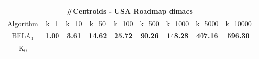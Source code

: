 \begin{tabular}{c|cccccccc}\toprule
\multicolumn{9}{c}{#Centroids - USA Roadmap dimacs}\\ \midrule
Algorithm & k=1 & k=10 & k=50 & k=100 & k=500 & k=1000 & k=5000 & k=10000 \\ \midrule
BELA$_0$ & \textbf{1.00} & \textbf{3.61} & \textbf{14.62} & \textbf{25.72} & \textbf{90.26} & \textbf{148.28} & \textbf{407.16} & \textbf{596.30} \\
K$_0$ & -- & -- & -- & -- & -- & -- & -- & -- \\ \bottomrule 
\end{tabular}
